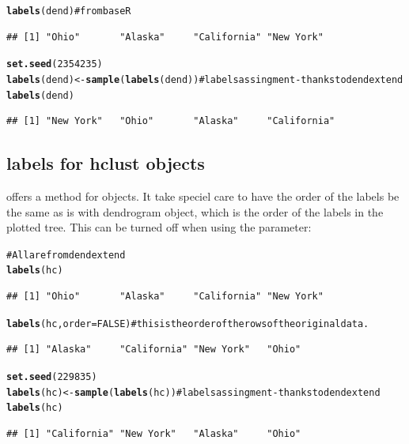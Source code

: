 \documentclass[shortnames,nojss,article]{jss}\usepackage{graphicx, color}
\makeatletter
\newcommand{\hlfunctioncall}[1]{\textcolor[rgb]{0.501960784313725,0,0.329411764705882}{\textbf{#1}}}%
\newcommand{\hlcomment}[1]{\textcolor[rgb]{0.180392156862745,0.6,0.341176470588235}{#1}}%
\newenvironment{kframe}{%
 \def\at@end@of@kframe{}%
 \ifinner\ifhmode%
  \def\at@end@of@kframe{\end{minipage}}%
  \begin{minipage}{\columnwidth}%
 \fi\fi%
 \def\FrameCommand##1{\hskip\@totalleftmargin \hskip-\fboxsep
 \colorbox{shadecolor}{##1}\hskip-\fboxsep
     \hskip-\linewidth \hskip-\@totalleftmargin \hskip\columnwidth}%
 \MakeFramed {\advance\hsize-\width
   \@totalleftmargin\z@ \linewidth\hsize
   \@setminipage}}%
 {\par\unskip\endMakeFramed%
 \at@end@of@kframe}
\newenvironment{knitrout}{}{} %
\makeatother
\begin{document}
\begin{knitrout}
\color{fgcolor}\begin{kframe}
\begin{alltt}
\hlfunctioncall{labels}(dend)  \hlcomment{# from base R}
\end{alltt}
\begin{verbatim}
## [1] "Ohio"       "Alaska"     "California" "New York"
\end{verbatim}
\begin{alltt}
\hlfunctioncall{set.seed}(2354235)
\hlfunctioncall{labels}(dend) <- \hlfunctioncall{sample}(\hlfunctioncall{labels}(dend))  \hlcomment{# labels assingment - thanks to dendextend}
\hlfunctioncall{labels}(dend)
\end{alltt}
\begin{verbatim}
## [1] "New York"   "Ohio"       "Alaska"     "California"
\end{verbatim}
\end{kframe}
\end{knitrout}



\subsection{labels for hclust objects}

 offers a  method for  objects. It take speciel care to have the order of the labels be the same as is with dendrogram object, which is the order of the labels in the plotted tree. This can be turned off when using the  parameter:

\begin{knitrout}
\color{fgcolor}\begin{kframe}
\begin{alltt}
\hlcomment{# All are from dendextend}
\hlfunctioncall{labels}(hc)
\end{alltt}
\begin{verbatim}
## [1] "Ohio"       "Alaska"     "California" "New York"
\end{verbatim}
\begin{alltt}
\hlfunctioncall{labels}(hc, order = FALSE)  \hlcomment{# this is the order of the rows of the original data.}
\end{alltt}
\begin{verbatim}
## [1] "Alaska"     "California" "New York"   "Ohio"
\end{verbatim}
\begin{alltt}
\hlfunctioncall{set.seed}(229835)
\hlfunctioncall{labels}(hc) <- \hlfunctioncall{sample}(\hlfunctioncall{labels}(hc))  \hlcomment{# labels assingment - thanks to dendextend}
\hlfunctioncall{labels}(hc)
\end{alltt}
\begin{verbatim}
## [1] "California" "New York"   "Alaska"     "Ohio"
\end{verbatim}
\end{kframe}
\end{knitrout}
\end{document}
